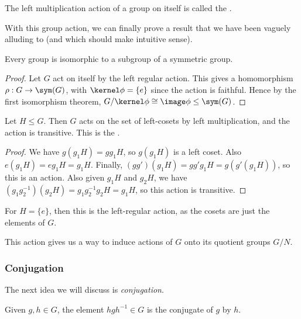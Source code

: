 \documentclass[a4paper]{scrartcl}
\begin{document}
\begin{definition}
	The left multiplication action of a group on itself is called the .
\end{definition}

With this group action, we can finally prove a result that we have been vaguely alluding to (and which should make intuitive sense).

\begin{theorem}
	Every group is isomorphic to a subgroup of a symmetric group. 
\end{theorem}
\begin{proof}
	Let $G$ act on itself by the left regular action. This gives a homomorphism $\rho: G \rightarrow \sym(G)$,
	with $\kernel \phi = \{e\}$ since the action is faithful. Hence by the first isomorphism theorem, $G/\kernel \phi \cong \image\phi \leq \sym(G)$.
\end{proof}

\begin{proposition}
	Let $H \leq G$. Then $G$ acts on the set of left-cosets by left multiplication, and the action is transitive. This is the .
\end{proposition}
\begin{proof}
	We have $g(g_1H) = gg_1 H$, so $g(g_1H)$ is a left coset. Also $e(g_1H) = e g_1 H = g_1 H$. Finally, $(gg')(g_1 H) = g g' g_1 H = g(g'(g_1 H))$, so this is an action. Also given $g_1 H$ and $g_2 H$, we have $(g_1 g_2^{-1})(g_2 H) = g_1 g_2^{-1} g_2 H = g_1 H$, so this action is transitive.
\end{proof}
\begin{remark}
	For $H = \{e\}$, then this is the left-regular action, as the cosets are just the elements of $G$.
\end{remark}
This action gives us a way to induce actions of $G$ onto its quotient groups $G/N$.

\subsubsection{Conjugation}

The next idea we will discuss is \emph{conjugation}.

\begin{definition}[Conugation]
	Given $g, h \in G$, the element $h g h^{-1} \in G$ is the conjugate of $g$ by $h$.
\end{definition}
\end{document}
